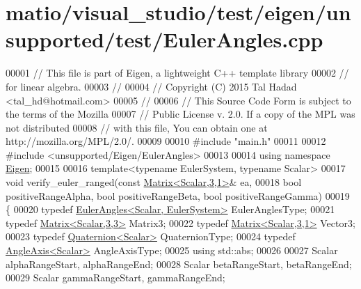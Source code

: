 \hypertarget{matio_2visual__studio_2test_2eigen_2unsupported_2test_2_euler_angles_8cpp_source}{}\section{matio/visual\+\_\+studio/test/eigen/unsupported/test/\+Euler\+Angles.cpp}
\label{matio_2visual__studio_2test_2eigen_2unsupported_2test_2_euler_angles_8cpp_source}

\begin{DoxyCode}
00001 \textcolor{comment}{// This file is part of Eigen, a lightweight C++ template library}
00002 \textcolor{comment}{// for linear algebra.}
00003 \textcolor{comment}{//}
00004 \textcolor{comment}{// Copyright (C) 2015 Tal Hadad <tal\_hd@hotmail.com>}
00005 \textcolor{comment}{//}
00006 \textcolor{comment}{// This Source Code Form is subject to the terms of the Mozilla}
00007 \textcolor{comment}{// Public License v. 2.0. If a copy of the MPL was not distributed}
00008 \textcolor{comment}{// with this file, You can obtain one at http://mozilla.org/MPL/2.0/.}
00009 
00010 \textcolor{preprocessor}{#include "main.h"}
00011 
00012 \textcolor{preprocessor}{#include <unsupported/Eigen/EulerAngles>}
00013 
00014 \textcolor{keyword}{using namespace }\hyperlink{namespace_eigen}{Eigen};
00015 
00016 \textcolor{keyword}{template}<\textcolor{keyword}{typename} EulerSystem, \textcolor{keyword}{typename} Scalar>
00017 \textcolor{keywordtype}{void} verify\_euler\_ranged(\textcolor{keyword}{const} \hyperlink{group___core___module}{Matrix<Scalar,3,1>}& ea,
00018   \textcolor{keywordtype}{bool} positiveRangeAlpha, \textcolor{keywordtype}{bool} positiveRangeBeta, \textcolor{keywordtype}{bool} positiveRangeGamma)
00019 \{
00020   \textcolor{keyword}{typedef} \hyperlink{class_eigen_1_1_euler_angles}{EulerAngles<Scalar, EulerSystem>} EulerAnglesType;
00021   \textcolor{keyword}{typedef} \hyperlink{group___core___module_class_eigen_1_1_matrix}{Matrix<Scalar,3,3>} Matrix3;
00022   \textcolor{keyword}{typedef} \hyperlink{group___core___module}{Matrix<Scalar,3,1>} Vector3;
00023   \textcolor{keyword}{typedef} \hyperlink{group___geometry___module_class_eigen_1_1_quaternion}{Quaternion<Scalar>} QuaternionType;
00024   \textcolor{keyword}{typedef} \hyperlink{group___geometry___module_class_eigen_1_1_angle_axis}{AngleAxis<Scalar>} AngleAxisType;
00025   \textcolor{keyword}{using} std::abs;
00026   
00027   Scalar alphaRangeStart, alphaRangeEnd;
00028   Scalar betaRangeStart, betaRangeEnd;
00029   Scalar gammaRangeStart, gammaRangeEnd;

\end{DoxyCode}
